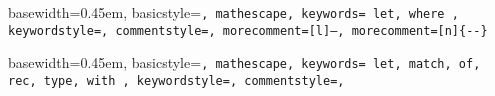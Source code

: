 \def\BT{\text{BT}}
\def\NF{\text{NF}}

\def\torel#1{\stackrel{#1}\to}
\def\reduce{\torel{\beta}}
\def\reduceback{\stackrel{\beta}\leftarrow}
\def\reducestar{\torel{\beta^*}}
\def\reducelm{\torel{\beta_{\text{lm}}}}
\def\reducelmstar{\torel{\beta^*_{\text{lm}}}}
\def\reducehead{\torel{\beta_{\text{h}}}}
\def\betaeq{\stackrel{\beta}\sim}

\def\upfrom{\uparrow}



\def\vec#1{{\overrightarrow {#1}}}


\def\set#1{{\{#1\}}}

\def\betaeq{{\stackrel \beta \sim}}



\def\brackets#1{\left[ {#1} \right]}

\def\vertlist#1{
    \begin{array}{lllll}
    #1
    \end{array}
}

\def\bracklist#1{\brackets{ \vertlist{#1} }}


\def\cases#1{
    \left\{ \vertlist {#1} \right.
}


\def\rulev#1#2{
    \begin{array}{l}
        #1
        \\
        \hline
        #2
    \end{array}
}

\def\ruleh#1#2{
    \begin{array}{c}
        #1
        \\
        \hline
        #2
    \end{array}
}




\theoremstyle{definition}
\newtheorem{definition}{Definition}[section] %
\newtheorem{theorem}[definition]{Theorem}    %
\newtheorem{lemma}[definition]{Lemma}
\newtheorem{corollary}[definition]{Corollary}
\newtheorem{example}[definition]{Example}



{ basewidth=0.45em,
  basicstyle=\small\tt,  %
  mathescape,
  keywords={
    let,
    where
  },
  keywordstyle=\color{blue},
  commentstyle=\color{brown},
  morecomment=[l]{--},
  morecomment=[n]{\{-}{-\}}
}

{ basewidth=0.45em,
  basicstyle=\small\tt,  %
  mathescape,
  keywords={
    let,
    match,
    of,
    rec,
    type,
    with
  },
  keywordstyle=\color{blue},
  commentstyle=\color{brown},
}


   {\lstset{language=lam}} {}
 {\lstset{language=ocaml}} {}

